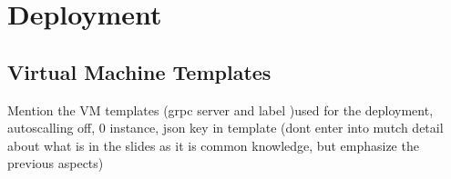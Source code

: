 \chapter{Deployment}\label{ch:deployment}

\section{Virtual Machine Templates}\label{sec:vm-templates}

Mention the VM templates (grpc server and label )used for the deployment,
autoscalling off, 0 instance,
json key in template (dont enter into mutch detail about what is in the slides as it is common knowledge,
but emphasize the previous aspects)
